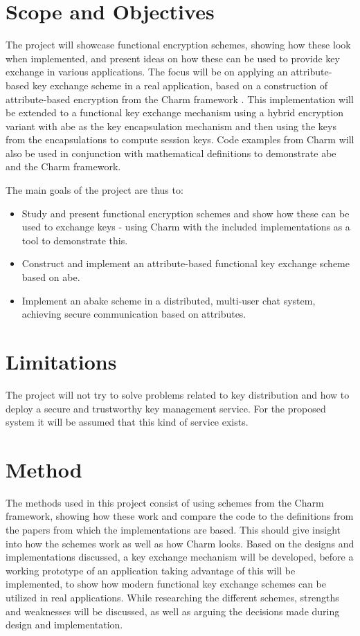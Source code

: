 \section{Scope and Objectives}\label{sec:scope}

The project will showcase functional encryption schemes, showing how these look when implemented, and present ideas on how these can be used to provide key exchange in various applications. The focus will be on applying an attribute-based key exchange scheme in a real application, based on a construction of attribute-based encryption from the Charm framework \cite{DBLP:Charm13}. This implementation will be extended to a functional key exchange mechanism using a hybrid encryption variant with \gls{abe} as the key encapsulation mechanism and then using the keys from the encapsulations to compute session keys. Code examples from Charm will also be used in conjunction with mathematical definitions to demonstrate \gls{abe} and the Charm framework. 
\par The main goals of the project are thus to:
\begin{itemize}
\item Study and present functional encryption schemes and show how these can be used to exchange keys - using Charm with the included implementations as a tool to demonstrate this.
\item Construct and implement an attribute-based functional key exchange scheme based on \gls{abe}.
\item Implement an \gls{abake} scheme in a distributed, multi-user chat system, achieving secure communication based on attributes.
\end{itemize}

\section{Limitations}\label{sec:limitations}
The project will not try to solve problems related to key distribution and how to deploy a secure and trustworthy key management service. For the proposed system it will be assumed that this kind of service exists.

\section{Method}
The methods used in this project consist of using schemes from the Charm framework, showing how these work and compare the code to the definitions from the papers from which the implementations are based. This should give insight into how the schemes work as well as how Charm looks. Based on the designs and implementations discussed, a key exchange mechanism will be developed, before a working prototype of an application taking advantage of this will be implemented, to show how modern functional key exchange schemes can be utilized in real applications. While researching the different schemes, strengths and weaknesses will be discussed, as well as arguing the decisions made during design and implementation.



